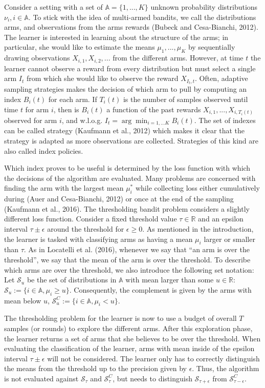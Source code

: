 \documentclass[11pt,]{article}
\begin{document}
Consider a setting with a set of \(\mathbb{A}=\{1, ..., K\}\) unknown
probability distributions \(\nu_i, i \in \mathbb{A}\). To stick with the
idea of multi-armed bandits, we call the distributions arms, and
observations from the arms rewards (Bubeck and Cesa-Bianchi, 2012). The
learner is interested in learning about the structure of the arms; in
particular, she would like to estimate the means \(\mu_1, ..., \mu_K\)
by sequentially drawing observations \(X_{i,1}, X_{i,2}, ...\) from the
different arms. However, at time \(t\) the learner cannot observe a
reward from every distribution but must select a single arm \(I_t\) from
which she would like to observe the reward \(X_{I_t,t}\). Often,
adaptive sampling strategies makes the decision of which arm to pull by
computing an index \(B_i(t)\) for each arm. If \(T_i(t)\) is the number
of samples observed until time \(t\) for arm \(i\), then is \(B_i(t)\) a
function of the past rewards \(X_{i,1}, ..., X_{i,T_i(t)}\) observed for
arm \(i\), and w.l.o.g. \(I_t = \arg \min_{i = 1,...K} B_i(t)\). The set
of indexes can be called strategy (Kaufmann et al., 2012) which makes it
clear that the strategy is adapted as more observations are collected.
Strategies of this kind are also called index policies.

Which index proves to be useful is determined by the loss function with
which the decisions of the algorithm are evaluated. Many problems are
concerned with finding the arm with the largest mean \(\mu_i^*\) while
collecting loss either cumulatively during (Auer and Cesa-Bianchi, 2012)
or once at the end of the sampling (Kaufmann et al., 2016). The
thresholding bandit problem considers a slightly different loss
function. Consider a fixed threshold value \(\tau \in \mathbb{R}\) and
an epsilon interval \(\tau \pm \epsilon\) around the threshold for
\(\epsilon \geq 0\). As mentioned in the introduction, the learner is
tasked with classifying arms as having a mean \(\mu_i\) larger or
smaller than \(\tau\). As in Locatelli et al. (2016), whenever we say
that ``an arm is over the threshold'', we say that the mean of the arm
is over the threshold. To describe which arms are over the threshold, we
also introduce the following set notation: Let \(\mathcal{S}_{u}\) be
the set of distributions in \(\mathbb{A}\) with mean larger than some
\(u \in \mathbb{R}\):
\(\mathcal{S}_{u} := \{i \in \mathbb{A}, \mu_i \geq u\}\). Consequently,
the complement is given by the arms with mean below \(u\),
\(\mathcal{S}^C_{u} := \{i \in \mathbb{A}, \mu_i < u\}\).

The thresholding problem for the learner is now to use a budget of
overall \(T\) samples (or rounds) to explore the different arms. After
this exploration phase, the learner returns a set of arms that she
believes to be over the threshold. When evaluating the classification of
the learner, arms with mean inside of the epsilon interval
\(\tau \pm \epsilon\) will not be considered. The learner only has to
correctly distinguish the means from the threshold up to the precision
given by \(\epsilon\). Thus, the algorithm is not evaluated against
\(\mathcal{S}_{\tau}\) and \(\mathcal{S}^C_{\tau}\), but needs to
distinguish \(\mathcal{S}_{\tau+\epsilon}\) from
\(\mathcal{S}^C_{\tau-\epsilon}\).
\end{document}
